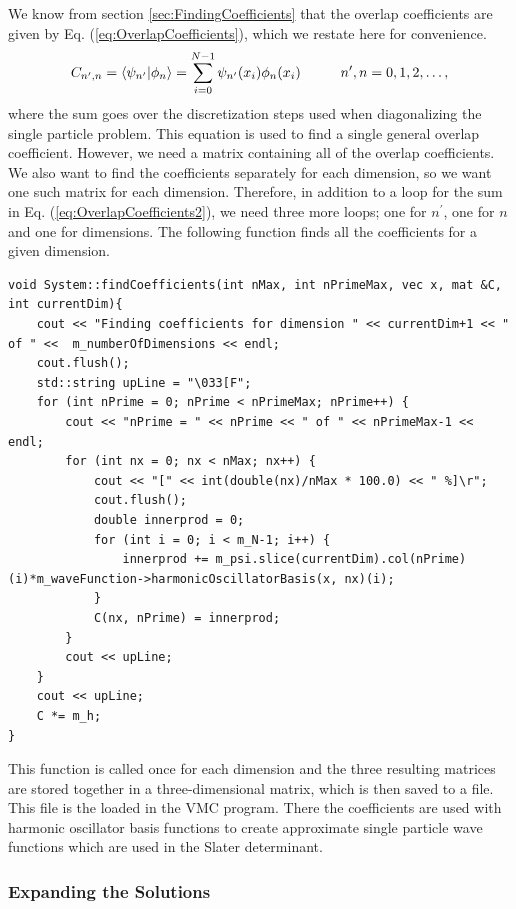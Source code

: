 \documentclass[../main.tex]{subfiles}
\begin{document}
We know from section \ref{sec:FindingCoefficients} that the overlap coefficients are given by Eq. (\ref{eq:OverlapCoefficients}), which we restate here for convenience.
\begin{equation}\label{eq:OverlapCoefficients2}
    C_{n^\prime,n} = \langle \psi_{n^\prime} \vert \phi_n\rangle = \sum_{i=0}^{N-1} \psi_{n^\prime}(x_i)\phi_n(x_i) \hspace{1 cm} n^\prime,n = 0,1,2,\dots,
\end{equation}
where the sum goes over the discretization steps used when diagonalizing the single particle problem. This equation is used to find a single general overlap coefficient. However, we need a matrix containing all of the overlap coefficients. We also want to find the coefficients separately for each dimension, so we want one such matrix for each dimension. Therefore, in addition to a loop for the sum in Eq. (\ref{eq:OverlapCoefficients2}), we need three more loops; one for $n^\prime$, one for $n$ and one for dimensions. The following function finds all the coefficients for a given dimension.
\lstset{language=c++}
\begin{lstlisting}[caption={}]
void System::findCoefficients(int nMax, int nPrimeMax, vec x, mat &C, int currentDim){
    cout << "Finding coefficients for dimension " << currentDim+1 << " of " <<  m_numberOfDimensions << endl;
    cout.flush();
    std::string upLine = "\033[F";
    for	(int nPrime = 0; nPrime < nPrimeMax; nPrime++) {
        cout << "nPrime = " << nPrime << " of " << nPrimeMax-1 << endl;
        for (int nx = 0; nx < nMax; nx++) {
            cout << "[" << int(double(nx)/nMax * 100.0) << " %]\r";
            cout.flush();
            double innerprod = 0;
            for (int i = 0; i < m_N-1; i++) {
                innerprod += m_psi.slice(currentDim).col(nPrime)(i)*m_waveFunction->harmonicOscillatorBasis(x, nx)(i);
            }
            C(nx, nPrime) = innerprod;
        }
        cout << upLine;
    }
    cout << upLine;
    C *= m_h;
}
\end{lstlisting}
This function is called once for each dimension and the three resulting matrices are stored together in a three-dimensional matrix, which is then saved to a file. This file is the loaded in the VMC program. There the coefficients are used with harmonic oscillator basis functions to create approximate single particle wave functions which are used in the Slater determinant.

\subsubsection{Expanding the Solutions}
\end{document}
